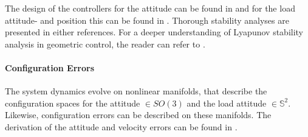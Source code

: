 The design of the controllers for the  attitude can be found in \cite{Lee2010} and for the load attitude- and position this can be found in \cite{Sreenath2013c}. Thorough stability analyses are presented in either references. For a deeper understanding of Lyapunov stability analysis in geometric control, the reader can refer to \cite{Bullo2005}.

\paragraph{Configuration Errors}\label{sec:con.errors}
The system dynamics evolve on nonlinear manifolds, that describe the configuration spaces for the  attitude $ \in SO(3) $ and the load attitude $ \in \mathbb{S}^2 $. Likewise, configuration errors can be described on these manifolds. The derivation of the attitude and velocity errors can be found in \cite{Bullo2005}.
 


